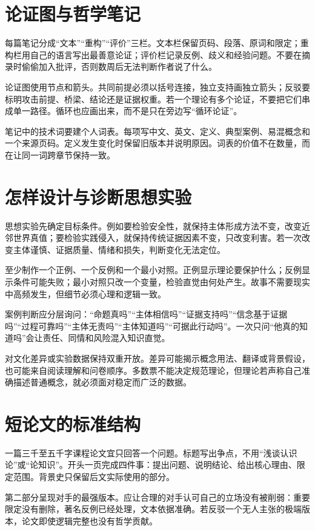 \section{论证图与哲学笔记}

每篇笔记分成“文本”“重构”“评价”三栏。文本栏保留页码、段落、原词和限定；重构栏用自己的语言写出最善意论证；评价栏记录反例、歧义和经验问题。不要在摘录时偷偷加入批评，否则数周后无法判断作者说了什么。

论证图使用节点和箭头。共同前提必须以括号连接，独立支持画独立箭头；反驳要标明攻击前提、桥梁、结论还是证据权重。若一个理论有多个论证，不要把它们串成单一路径。循环也应画出来，而不是只在旁边写“循环论证”。

笔记中的技术词要建个人词表。每项写中文、英文、定义、典型案例、易混概念和一个来源页码。定义发生变化时保留旧版本并说明原因。词表的价值不在数量，而在让同一词跨章节保持一致。

\section{怎样设计与诊断思想实验}

思想实验先确定目标条件。例如要检验安全性，就保持主体形成方法不变，改变近邻世界真值；要检验实践侵入，就保持传统证据因素不变，只改变利害。若一次改变主体谨慎、证据质量、情绪和损失，判断变化无法定位。

至少制作一个正例、一个反例和一个最小对照。正例显示理论要保护什么；反例显示条件可能失败；最小对照只改一个变量，检验直觉由何处产生。故事不需要现实中高频发生，但细节必须心理和逻辑一致。

案例判断应分层询问：“命题真吗”“主体相信吗”“证据支持吗”“信念基于证据吗”“过程可靠吗”“主体无责吗”“主体知道吗”“可据此行动吗”。一次只问“他真的知道吗”会让责任、同情和风险混入知识直觉。

对文化差异或实验数据保持双重开放。差异可能揭示概念用法、翻译或背景假设，也可能来自阅读理解和问卷顺序。多数票不能决定规范理论，但理论若声称自己准确描述普通概念，就必须面对稳定而广泛的数据。

\section{短论文的标准结构}

一篇三千至五千字课程论文宜只回答一个问题。标题写出争点，不用“浅谈认识论”或“论知识”。开头一页完成四件事：提出问题、说明结论、给出核心理由、限定范围。背景史只保留后文实际使用的部分。

第二部分呈现对手的最强版本。应让合理的对手认可自己的立场没有被削弱：重要限定没有删除，著名反例已经处理，文本依据准确。若反驳一个无人主张的极端版本，论文即使逻辑完整也没有哲学贡献。

